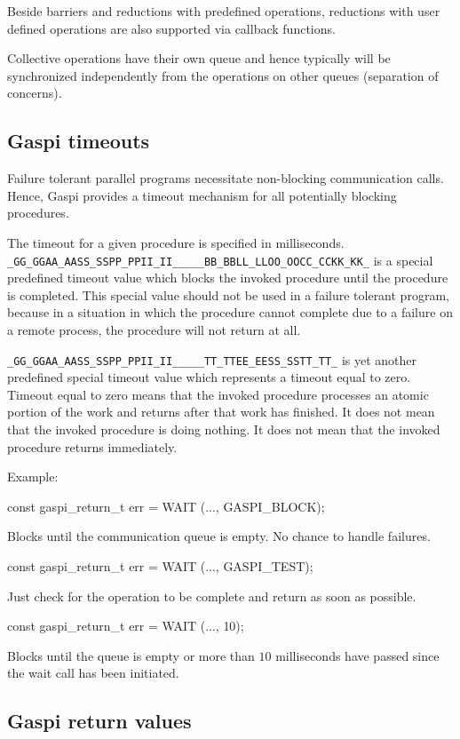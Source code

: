 \documentclass{article}
\makeatletter
\newlength{\st}\setlength{\st}{0pt}
\newcommand{\zerowsep}{\hskip 0pt plus 0.1pt minus 0.1pt}
\newcommand{\ZSEP}[1]{\ifx#1\@@@EOZ@@@\let\next\relax\else\ifx#1\_#1\zerowsep\else#1\fi\let\next\ZSEP\fi\next}
\newcommand{\zsep}[1]{\ZSEP{}#1\@@@EOZ@@@}
\newcommand{\GASPI}{{\sc Gaspi}}
\newcommand{\GASPITEST}{{\tt\protect\zsep{GASPI\_TEST}}}
\newcommand{\GASPIBLOCK}{{\tt\protect\zsep{GASPI\_BLOCK}}}
\makeatother
\begin{document}
Beside barriers and reductions with predefined operations, 
reductions with user defined operations are also supported via callback
functions.

Collective operations have their own queue and hence typically will be synchronized 
independently from the operations on other queues (separation of concerns).

\subsection{\GASPI{} timeouts}
\label{SubSec::Timeout}

Failure tolerant parallel programs necessitate non-blocking
communication calls.  Hence, \GASPI{} provides a timeout mechanism for
all potentially blocking procedures.

The timeout for a given procedure is specified in milliseconds.
\GASPIBLOCK{} is a special predefined timeout value which blocks the
invoked procedure until the procedure is completed. This special value
should not be used in a failure tolerant program, because in a
situation in which the procedure cannot complete due to a failure on a
remote process, the procedure will not return at all.

\GASPITEST{} is yet another predefined special timeout value which
represents a timeout equal to zero. Timeout equal to zero means that
the invoked procedure processes an atomic portion of the work and
returns after that work has finished. It does not mean that the
invoked procedure is doing nothing. It does not mean that the invoked
procedure returns immediately.

Example:
\begin{listing}{1}
const gaspi_return_t err = WAIT (..., GASPI_BLOCK);
\end{listing}
Blocks until the communication queue is empty. No chance to handle
failures.
\begin{listing}{1}
const gaspi_return_t err = WAIT (..., GASPI_TEST);
\end{listing}
Just check for the operation to be complete and return as soon as possible.
\begin{listing}{1}
const gaspi_return_t err = WAIT (..., 10);
\end{listing}
Blocks until the queue is empty or more than $10$ milliseconds have
passed since the wait call has been initiated.

\subsection{\GASPI{} return values}
\end{document}
